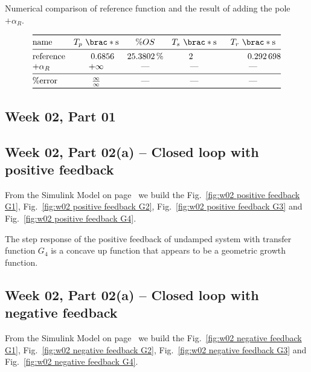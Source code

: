 \documentclass[12pt]{article}
\DeclarePairedDelimiter\brac[]%
\begin{document}
\begin{table}[]
    \centering
    \caption{Numerical comparison of reference function and the result of adding the pole $+\alpha_R$.}
    \[
        \begin{array}{@{}>$l<$*4S@{}}
        \toprule
            name &
            T_p\ \brac*{\si\second}
                & \%OS
                & T_s\ \brac*{\si\second}
                & T_r\ \brac*{\si\second}
        \\*
        \midrule
            reference &
            0.6856 & \SI{25.3802}\percent & 2 & 0.292698
        \\*
            $+\alpha_R$ &
            \text{$+\infty$} & \text{---} & \text{---} & \text{---}
        \\*
        \midrule
            \%error &
            \frac\infty\infty
                & \text{---}
                & \text{---}
                & \text{---}
        \\*
        \bottomrule
        \end{array}
    \]
    \label{tab:positive real poles}
\end{table}

\subsection{Week 02, Part 01}

\subsection{Week 02, Part 02(a) -- Closed loop with positive feedback}

From the Simulink Model on page~\pageref{pdf:positive feedback}
we build the Fig.~\ref{fig:w02 positive feedback G1}, Fig.~\ref{fig:w02 positive feedback G2}, Fig.~\ref{fig:w02 positive feedback G3} and Fig.~\ref{fig:w02 positive feedback G4}.

The step response of the positive feedback of undamped system with transfer function $G_4$ is a concave up function that appears to be a geometric growth function.

\subsection{Week 02, Part 02(a) -- Closed loop with negative feedback}

From the Simulink Model on page~\pageref{pdf:negative feedback}
we build the Fig.~\ref{fig:w02 negative feedback G1}, Fig.~\ref{fig:w02 negative feedback G2}, Fig.~\ref{fig:w02 negative feedback G3} and Fig.~\ref{fig:w02 negative feedback G4}.
\end{document}
